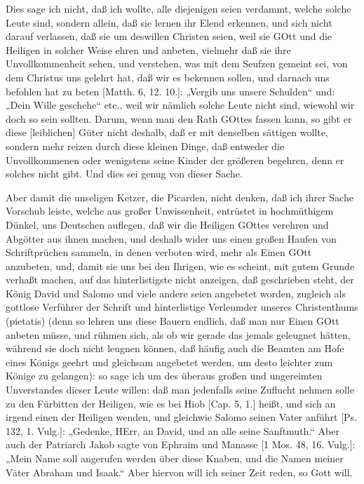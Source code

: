 Dies sage ich nicht, daß ich wollte, alle diejenigen seien verdammt, welche solche Leute sind, sondern allein, daß sie lernen ihr Elend erkennen, und sich nicht darauf verlassen, daß sie um deswillen Christen seien, weil sie GOtt und die Heiligen in solcher Weise ehren und anbeten, vielmehr daß sie ihre Unvollkommenheit sehen, und verstehen, was mit dem Seufzen gemeint sei, von dem Christus uns gelehrt hat, daß wir es bekennen sollen, und darnach uns befohlen hat zu beten [Matth. 6, 12. 10.]: „Vergib uns unsere Schulden“ und: „Dein Wille geschehe“ etc., weil wir nämlich solche Leute nicht sind, wiewohl wir doch so sein sollten. Darum, wenn man den Rath GOttes fassen kann, so gibt er diese [leiblichen] Güter nicht deshalb, daß er mit denselben
sättigen wollte, sondern mehr reizen durch diese kleinen Dinge, daß entweder die Unvollkommenen oder wenigstens seine Kinder der größeren begehren, denn er solches nicht gibt. Und dies sei genug von dieser Sache.

Aber damit die unseligen Ketzer, die Picarden, nicht denken, daß ich ihrer Sache Vorschub leiste, welche aus großer Unwissenheit, entrüstet in hochmüthigem Dünkel, uns Deutschen auflegen, daß wir die Heiligen GOttes verehren und Abgötter aus ihnen machen, und deshalb wider uns einen großen Haufen von Schriftprüchen sammeln, in denen verboten wird, mehr als Einen GOtt anzubeten, und, damit sie uns bei den Ihrigen, wie es scheint, mit gutem Grunde verhaßt machen, auf das hinterlistigste nicht anzeigen, daß geschrieben steht, der König David und Salomo und viele andere seien angebetet worden, zugleich als gottlose Verführer der Schrift und hinterlistige Verleumder unseres Christenthums (pietatis) (denn so lehren uns diese Bauern endlich, daß man nur Einen GOtt anbeten müsse, und rühmen sich, als ob wir gerade das jemals geleugnet hätten, während sie doch nicht leugnen können, daß häufig auch die Beamten am Hofe eines Königs geehrt und gleichsam angebetet werden, um desto leichter zum Könige zu gelangen): so sage ich um des überaus großen und ungereimten Unverstandes dieser Leute willen: daß man jedenfalls seine Zuflucht nehmen solle zu den Fürbitten der Heiligen, wie es bei Hiob [Cap. 5, 1.] heißt, und sich an irgend einen der Heiligen wenden, und gleichwie Salomo seinen Vater anführt [Ps. 132, 1. Vulg.]: „Gedenke, HErr, an David, und an alle seine Sanftmuth.“ Aber auch der Patriarch Jakob sagte von Ephraim und Manasse [1 Mos. 48, 16. Vulg.]: „Mein Name soll angerufen werden über diese Knaben, und die Namen meiner Väter Abraham und Isaak.“ Aber hiervon will ich seiner Zeit reden, so Gott will.

